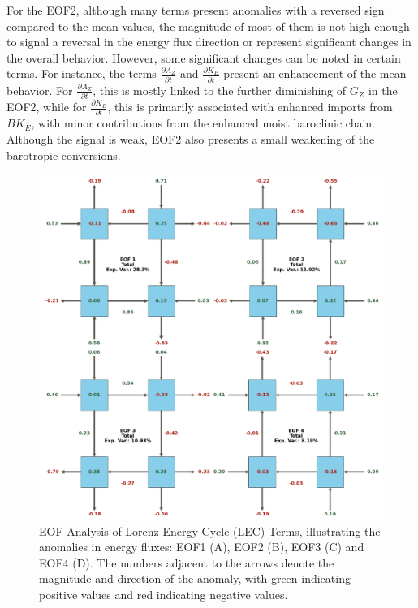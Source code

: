 For the EOF2, although many terms present anomalies with a reversed sign compared to the mean values, the magnitude of most of them is not high enough to signal a reversal in the energy flux direction or represent significant changes in the overall behavior. However, some significant changes can be noted in certain terms. For instance, the terms $\frac{\partial A_Z}{\partial t}$ and $\frac{\partial K_E}{\partial t}$ present an enhancement of the mean behavior. For $\frac{\partial A_Z}{\partial t}$, this is mostly linked to the further diminishing of $G_Z$ in the EOF2, while for $\frac{\partial K_E}{\partial t}$, this is primarily associated with enhanced imports from $BK_E$, with minor contributions from the enhanced moist baroclinic chain. Although the signal is weak, EOF2 also presents a small weakening of the barotropic conversions.

\begin{figure}[!htbp]
\centering
\includegraphics[width=\textwidth]{figs_5/eofs_total.pdf}
\caption[EOF Analysis - Total Lifecycle]{EOF Analysis of Lorenz Energy Cycle (LEC) Terms, illustrating the anomalies in energy fluxes: EOF1 (A), EOF2 (B), EOF3 (C) and EOF4 (D). 
The numbers adjacent to the arrows denote the magnitude and direction of the anomaly, with green indicating positive values and red indicating negative values.}
\label{fig:eofs_total}
\end{figure}

